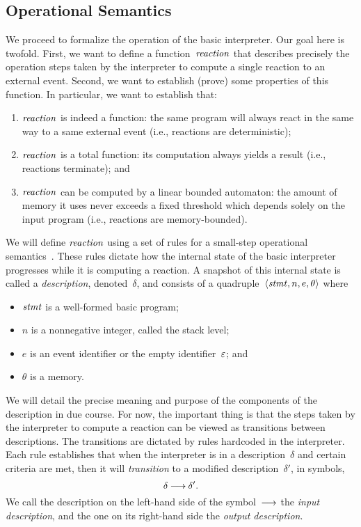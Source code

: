 \subsection{Operational Semantics}
\label{sec.sem.opsem}

We proceed to formalize the operation of the basic \CEU interpreter.  Our
goal here is twofold.  First, we want to define a function~$\mathop{\mathit{reaction}}$ that
describes precisely the operation steps taken by the interpreter to compute
a single reaction to an external event.  Second, we want to establish
(prove) some properties of this function.  In particular, we want to
establish that:
\begin{enumerate}
\item $\mathop{\mathit{reaction}}$ is indeed a function: the same program will always react
  in the same way to a same external event (i.e., reactions are
  deterministic);
\item $\mathop{\mathit{reaction}}$ is a total function: its computation always yields a
  result (i.e., reactions terminate); and
\item $\mathop{\mathit{reaction}}$ can be computed by a linear bounded automaton: the amount
  of memory it uses never exceeds a fixed threshold which depends solely on
  the input program (i.e., reactions are memory-bounded).
\end{enumerate}

We will define $\mathop{\mathit{reaction}}$ using a set of rules for a small-step operational
semantics~\cite{Plotkin-G-D-1981}.  These rules dictate how the internal
state of the basic \CEU interpreter progresses while it is computing a
reaction.  A snapshot of this internal state is called a \emph{description},
denoted~$\delta$, and consists of a quadruple~$\<\stmt,n,e,\theta>$ where
\begin{itemize}
\item $\mathit{stmt}$ is a well-formed basic \CEU program;
\item $n$ is a nonnegative integer, called the stack level;
\item $e$ is an event identifier or the empty identifier~$\varepsilon$;
  and
\item $\theta$ is a memory.
\end{itemize}

We will detail the precise meaning and purpose of the components of the
description in due course.  For now, the important thing is that the steps
taken by the interpreter to compute a reaction can be viewed as transitions
between descriptions.  The transitions are dictated by rules hardcoded in
the interpreter.  Each rule establishes that when the interpreter is in a
description~$\delta$ and certain criteria are met, then it will
\emph{transition} to a modified description~$\delta'$, in symbols,
\[
  \delta\trans\delta'.
\]
We call the description on the left-hand side of the symbol~$\trans$ the
\emph{input description}, and the one on its right-hand side the
\emph{output description}.

